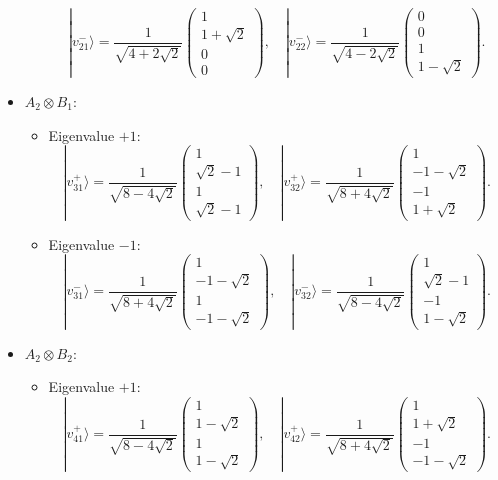 \documentclass{article}
\begin{document}
\begin{itemize}
\begin{itemize}
        \[
        |v_{21}^-\rangle = \frac{1}{\sqrt{4+2\sqrt{2}}} \begin{pmatrix} 1 \\ 1+\sqrt{2} \\ 0 \\ 0 \end{pmatrix}, \quad |v_{22}^-\rangle = \frac{1}{\sqrt{4-2\sqrt{2}}} \begin{pmatrix} 0 \\ 0 \\ 1 \\ 1-\sqrt{2} \end{pmatrix}.
        \]
    \end{itemize}
    \item \( A_2 \otimes B_1 \):
    \begin{itemize}
        \item Eigenvalue \( +1 \):
        \[
        |v_{31}^+\rangle = \frac{1}{\sqrt{8-4\sqrt{2}}} \begin{pmatrix} 1 \\ \sqrt{2}-1 \\ 1 \\ \sqrt{2}-1 \end{pmatrix}, \quad |v_{32}^+\rangle = \frac{1}{\sqrt{8+4\sqrt{2}}} \begin{pmatrix} 1 \\ -1-\sqrt{2} \\ -1 \\ 1+\sqrt{2} \end{pmatrix}.
        \]
        \item Eigenvalue \( -1 \):
        \[
        |v_{31}^-\rangle = \frac{1}{\sqrt{8+4\sqrt{2}}} \begin{pmatrix} 1 \\ -1-\sqrt{2} \\ 1 \\ -1-\sqrt{2} \end{pmatrix}, \quad |v_{32}^-\rangle = \frac{1}{\sqrt{8-4\sqrt{2}}} \begin{pmatrix} 1 \\ \sqrt{2}-1 \\ -1 \\ 1-\sqrt{2} \end{pmatrix}.
        \]
    \end{itemize}
    \item \( A_2 \otimes B_2 \):
    \begin{itemize}
        \item Eigenvalue \( +1 \):
        \[
        |v_{41}^+\rangle = \frac{1}{\sqrt{8-4\sqrt{2}}} \begin{pmatrix} 1 \\ 1-\sqrt{2} \\ 1 \\ 1-\sqrt{2} \end{pmatrix}, \quad |v_{42}^+\rangle = \frac{1}{\sqrt{8+4\sqrt{2}}} \begin{pmatrix} 1 \\ 1+\sqrt{2} \\ -1 \\ -1-\sqrt{2} \end{pmatrix}.
\]
\end{itemize}
\end{itemize}
\end{document}
